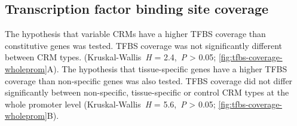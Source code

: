\documentclass[../main.tex]{subfiles}
\begin{document}
{{\subsection{Transcription factor binding site coverage}
The hypothesis that variable CRMs have a higher TFBS coverage than constitutive genes was tested.
TFBS coverage was not significantly different between CRM types. (Kruskal\hyp{}Wallis~\textit{H} = 2.4,~\textit{P} \textgreater{} 0.05; \autoref{fig:tfbs-coverage-wholeprom}A).
The hypothesis that tissue\hyp{}specific genes have a higher TFBS coverage than non\hyp{}specific genes was also  tested. TFBS coverage did not differ significantly between non\hyp{}specific, tissue\hyp{}specific or control CRM types at the whole promoter level (Kruskal\hyp{}Wallis~\textit{H} = 5.6,~\textit{P} \textgreater{} 0.05; \autoref{fig:tfbs-coverage-wholeprom}B).

}}
\end{document}
